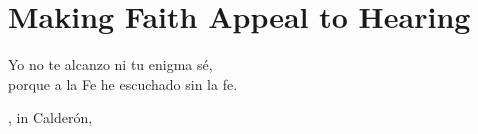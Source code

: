 


\chapter{Making Faith Appeal to Hearing}
\label{ch:faith-hearing}

\epigraph
{Yo no te alcanzo ni tu enigma sé, \\ 
porque a la Fe he escuchado sin la fe.}
{, in Calderón, }

